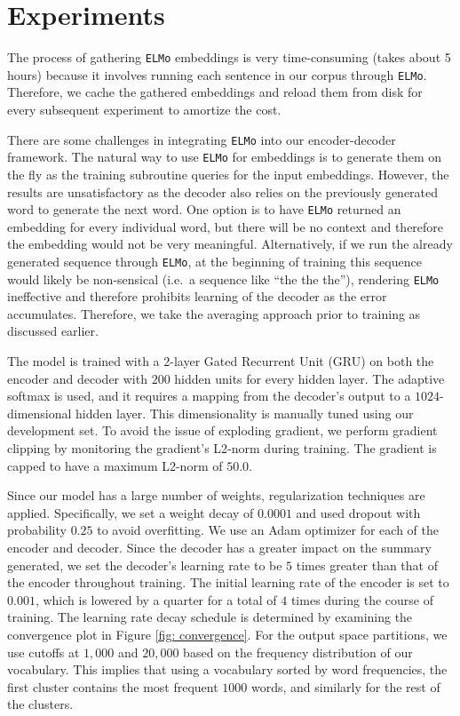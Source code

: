\section{Experiments}
\label{sec: exp}

The process of gathering \texttt{ELMo} embeddings is very time-consuming (takes about 5 hours) because it involves running each sentence in our corpus through \texttt{ELMo}. Therefore, we cache the gathered embeddings and reload them from disk for every subsequent experiment to amortize the cost. 

There are some challenges in integrating \texttt{ELMo} into our encoder-decoder framework. The natural way to use \texttt{ELMo} for embeddings is to generate them on the fly as the training subroutine queries for the input embeddings. However, the results are unsatisfactory as the decoder also relies on the previously generated word to generate the next word. One option is to have \texttt{ELMo} returned an embedding for every individual word, but there will be no context and therefore the embedding would not be very meaningful. Alternatively, if we run the already generated sequence through \texttt{ELMo}, at the beginning of training this sequence would likely be non-sensical (i.e.\ a sequence like ``the the the''), rendering \texttt{ELMo} ineffective and therefore prohibits learning of the decoder as the error accumulates. Therefore, we take the averaging approach prior to training as discussed earlier.

The model is trained with a 2-layer Gated Recurrent Unit (GRU) on both the encoder and decoder with $200$ hidden units for every hidden layer. The adaptive softmax is used, and it requires a mapping from the decoder's output to a $1024$-dimensional hidden layer. This dimensionality is manually tuned using our development set. To avoid the issue of exploding gradient, we perform gradient clipping by monitoring the gradient's L2-norm during training. The gradient is capped to have a maximum L2-norm of $50.0$.

Since our model has a large number of weights, regularization techniques are applied. Specifically, we set a weight decay of $0.0001$ and used dropout with probability $0.25$ to avoid overfitting. We use an Adam optimizer \cite{kingma2014adam} for each of the encoder and decoder. Since the decoder has a greater impact on the summary generated, we set the decoder's learning rate to be $5$ times greater than that of the encoder throughout training. The initial learning rate of the encoder is set to $0.001$, which is lowered by a quarter for a total of $4$ times during the course of training. The learning rate decay schedule is determined by examining the convergence plot in Figure \ref{fig: convergence}. For the output space partitions, we use cutoffs at $1,000$ and $20,000$ based on the frequency distribution of our vocabulary. This implies that using a vocabulary sorted by word frequencies, the first cluster contains the most frequent $1000$ words, and similarly for the rest of the clusters.

